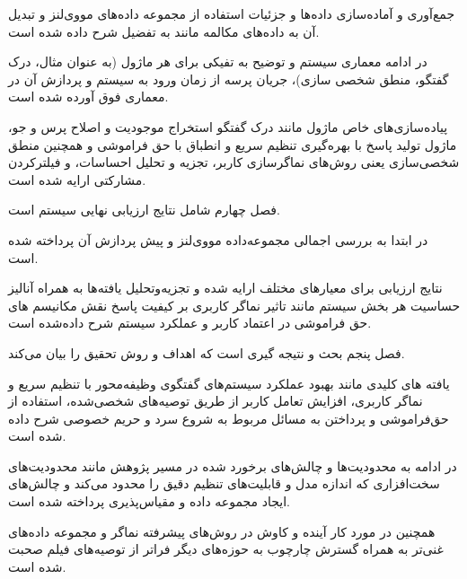 جمع‌آوری و آماده‌سازی داده‌ها و جزئیات استفاده از مجموعه داده‌های مووی‌لنز  و تبدیل آن به داده‌های مکالمه مانند به تفضیل شرح داده شده است.

در ادامه معماری سیستم و توضیح به تفیکی برای هر ماژول (به عنوان مثال، درک گفتگو، منطق شخصی سازی)، جریان پرسه از زمان ورود به سیستم و  پردازش آن در معماری فوق آورده شده است.

پیاده‌سازی‌های خاص ماژول مانند درک گفتگو استخراج موجودیت و اصلاح پرس و جو، ماژول تولید پاسخ با بهره‌گیری تنظیم سریع و انطباق با حق فراموشی و همچنین منطق شخصی‌سازی یعنی روش‌های نماگر‌سازی کاربر، تجزیه و تحلیل احساسات، و فیلتر‌کردن مشارکتی ارایه شده است.


فصل چهارم شامل نتایج ارزیابی نهایی سیستم است.

در ابتدا به بررسی اجمالی مجموعه‌داده مووی‌لنز و پیش پردازش آن پرداخته شده است.

نتایج ارزیابی برای معیارهای مختلف ارایه شده و  تجزیه‌و‌تحلیل یافته‌ها به همراه آنالیز حساسیت هر بخش سیستم مانند تاثیر نماگر کاربری بر کیفیت پاسخ  نقش مکانیسم های حق فراموشی در اعتماد کاربر و عملکرد سیستم شرح داده‌شده است.


فصل پنجم بحث و نتیجه گیری است که اهداف و روش تحقیق را بیان می‌کند.

یافته های کلیدی مانند بهبود عملکرد  سیستم‌های گفتگوی وظیفه‌محور با تنظیم سریع و نماگر کاربری، افزایش تعامل کاربر از طریق توصیه‌های شخصی‌شده، استفاده از حق‌فراموشی و پرداختن به مسائل مربوط به شروع سرد و حریم خصوصی شرح داده شده است.

در ادامه به محدودیت‌ها و چالش‌های برخورد شده در مسیر پژوهش مانند محدودیت‌های سخت‌افزاری که اندازه مدل و قابلیت‌های تنظیم دقیق را محدود می‌کند و چالش‌های ایجاد مجموعه داده و مقیاس‌پذیری پرداخته شده است.

همچنین در مورد کار آینده و کاوش در روش‌های پیشرفته نماگر و مجموعه داده‌های غنی‌تر به همراه گسترش چارچوب به حوزه‌های دیگر فراتر از توصیه‌های فیلم صحبت شده است.
